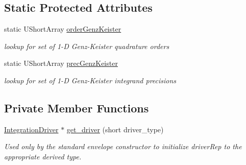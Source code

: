 \subsection*{Static Protected Attributes}
\begin{DoxyCompactItemize}
\item 
static U\+Short\+Array \hyperlink{classPecos_1_1IntegrationDriver_aaa634e4b0fa4d99e12ffd1f18def2382}{order\+Genz\+Keister}\label{classPecos_1_1IntegrationDriver_aaa634e4b0fa4d99e12ffd1f18def2382}

\begin{DoxyCompactList}\small\item\em lookup for set of 1-\/D Genz-\/\+Keister quadrature orders \end{DoxyCompactList}\item 
static U\+Short\+Array \hyperlink{classPecos_1_1IntegrationDriver_afa718e981f5bfc14c6c78ac59e46994e}{prec\+Genz\+Keister}\label{classPecos_1_1IntegrationDriver_afa718e981f5bfc14c6c78ac59e46994e}

\begin{DoxyCompactList}\small\item\em lookup for set of 1-\/D Genz-\/\+Keister integrand precisions \end{DoxyCompactList}\end{DoxyCompactItemize}
\subsection*{Private Member Functions}
\begin{DoxyCompactItemize}
\item 
\hyperlink{classPecos_1_1IntegrationDriver}{Integration\+Driver} $\ast$ \hyperlink{classPecos_1_1IntegrationDriver_a2c88277b463a123722a4f252fdb16bba}{get\+\_\+driver} (short driver\+\_\+type)
\begin{DoxyCompactList}\small\item\em Used only by the standard envelope constructor to initialize driver\+Rep to the appropriate derived type. \end{DoxyCompactList}\end{DoxyCompactItemize}
